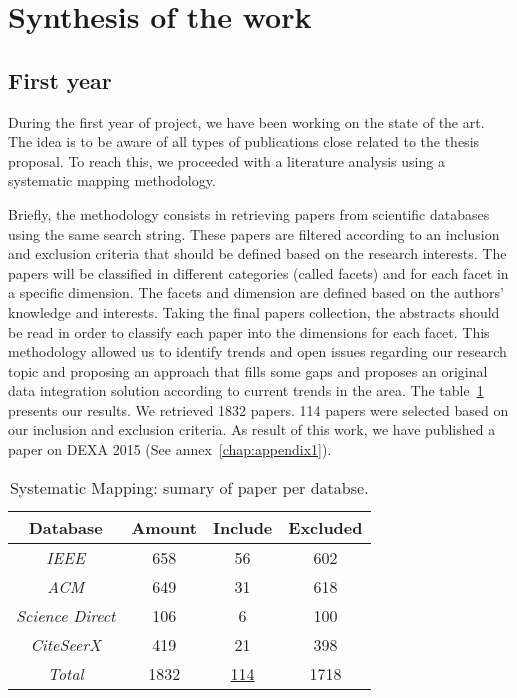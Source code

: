 \section{Synthesis of the work}
%
%
\subsection{First year}

During the first year of project, we have been working on the state of the art. The idea is to be aware of all types of publications close related to the thesis proposal. To reach this, we proceeded with a literature analysis using a systematic mapping methodology. 
	
Briefly, the methodology consists in retrieving papers from scientific databases using the same search string. 
These papers are filtered according to an inclusion and exclusion criteria that should be defined based on the research interests. 
The papers will be classified in different categories (called facets) and for each facet in a specific dimension. 
The facets and dimension are defined based on the authors' knowledge and interests. 
Taking the final papers collection, the abstracts should be read in order to classify each paper into the dimensions for each facet. 
This methodology allowed us to identify trends and open issues regarding our research topic and proposing an approach that fills some gaps and proposes an original data integration solution according to current trends in the area.
The table~\ref{table:sysmap} presents our results. We retrieved 1832 papers. 114 papers were selected based on our inclusion and exclusion criteria.
As result of this work, we have published a paper on DEXA 2015 (See annex~\ref{chap:appendix1}).

\begin{table}
\center
\begin{tabular}{|c|c|c|c|}
\hline 
\textbf{Database} & \textbf{Amount} & \textbf{Include} & \textbf{Excluded} \\ 
\hline 
\textit{IEEE} & 658 & 56 & 602 \\ 
\hline 
\textit{ACM} & 649 & 31 & 618 \\ 
\hline 
\textit{Science Direct} & 106 & 6 & 100 \\ 
\hline 
\textit{CiteSeerX} & 419 & 21 & 398 \\ 
\hline 
\textit{Total} & 1832 & \underline{114} & 1718 \\ 
\hline 
\end{tabular} 
\caption{Systematic Mapping: sumary of paper per databse.}\label{table:sysmap}
\end{table} 

